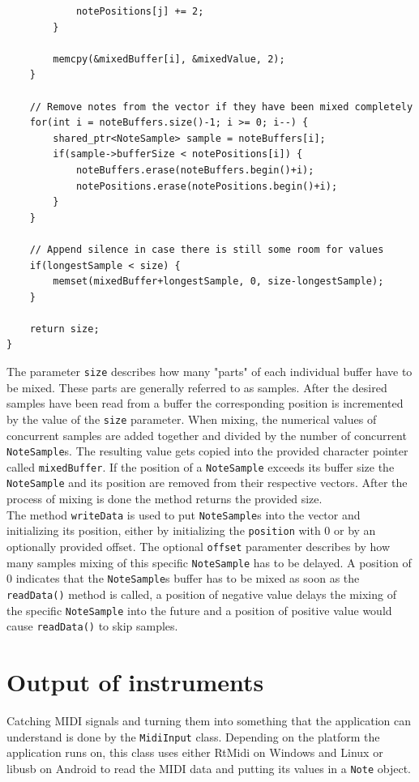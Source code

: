 \begin{lstlisting}
            notePositions[j] += 2;
        }

        memcpy(&mixedBuffer[i], &mixedValue, 2);
    }

    // Remove notes from the vector if they have been mixed completely
    for(int i = noteBuffers.size()-1; i >= 0; i--) {
        shared_ptr<NoteSample> sample = noteBuffers[i];
        if(sample->bufferSize < notePositions[i]) {
            noteBuffers.erase(noteBuffers.begin()+i);
            notePositions.erase(notePositions.begin()+i);
        }
    }

    // Append silence in case there is still some room for values
    if(longestSample < size) {
        memset(mixedBuffer+longestSample, 0, size-longestSample);
    }

    return size;
}
\end{lstlisting}

The parameter {\tt size} describes how many "parts" of each individual buffer have to be mixed. 
These parts are generally referred to as samples. After the desired samples have been read 
from a buffer the corresponding position is incremented by the value of the {\tt size} parameter. 
When mixing, the numerical values of concurrent samples are added together and divided by 
the number of concurrent {\tt NoteSample}s. The resulting value gets copied into the provided 
character pointer called {\tt mixedBuffer}. If the position of a {\tt NoteSample} exceeds its 
buffer size the {\tt NoteSample} and its position are removed from their respective vectors. 
After the process of mixing is done the method returns the provided size.
\\
The method {\tt writeData} is used to put {\tt NoteSample}s into the vector and 
initializing its position, either by initializing the {\tt position} with 0 
or by an optionally provided offset. The optional {\tt offset} paramenter describes by how many samples 
mixing of this specific {\tt NoteSample} has to be delayed. A position of 0 indicates that the 
{\tt NoteSample}s buffer has to be mixed as soon as the {\tt readData()} method is called, 
a position of negative value delays the mixing of the specific {\tt NoteSample} 
into the future and a position of positive value would cause {\tt readData()} to skip samples.

\section{Output of instruments}

Catching MIDI signals and turning them into something that the application can 
understand is done by the {\tt MidiInput} class. Depending on the platform the 
application runs on, this class uses either RtMidi on Windows and Linux or libusb on 
Android to read the MIDI data and putting its values in a {\tt Note} object. 

